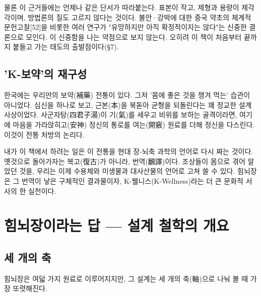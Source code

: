 \documentclass[12pt,oneside]{book}
\begin{document}
물론 이 근거들에는 언제나 같은 단서가 따라붙는다. 표본이 작고, 제형과 용량이 제각각이며, 방법론의 질도 고르지 않다는 것이다. 불안·강박에 대한 중국 약초의 체계적 문헌고찰[52]을 비롯한 여러 연구가 "유망하지만 아직 확정적이지는 않다"는 신중한 결론으로 모인다. 이 신중함을 나는 약점으로 보지 않는다. 오히려 이 책이 처음부터 끝까지 붙들고 가는 태도의 출발점이다(§7).

\subsection{'K-보약'의 재구성}

한국에는 우리만의 보약(補藥) 전통이 있다. 그저 '몸에 좋은 것을 챙겨 먹는' 습관이 아니었다. 심신을 하나로 보고, 근본(本)을 북돋아 균형을 되돌린다는 꽤 정교한 설계 사상이었다. 사군자탕(四君子湯)이 기(氣)를 세우고 비위를 보하는 골격이라면, 여기에 마음을 가라앉히고(安神) 정신의 통로를 여는(開竅) 원료를 더해 정신을 다스린다. 이것이 전통 처방의 논리다.

내가 이 책에서 하려는 일은 이 전통을 현대 장-뇌축 과학의 언어로 다시 짜는 것이다. 옛것으로 돌아가자는 복고(復古)가 아니라, 번역(飜譯)이다. 조상들이 몸으로 겪어 알았던 것을, 우리는 이제 수용체와 미생물과 대사산물의 언어로 고쳐 쓸 수 있다. 힘뇌장은 그 번역이 낳은 구체적인 결과물이자, K-웰니스(K-Wellness)라는 더 큰 문화적 서사의 한 실천이다.

\section{힘뇌장이라는 답 — 설계 철학의 개요}

\subsection{세 개의 축}

힘뇌장은 여덟 가지 원료로 이루어지지만, 그 설계는 세 개의 축(軸)으로 나눠 볼 때 가장 또렷해진다.

\vspace{2pt}\vspace{3pt}
\end{document}
